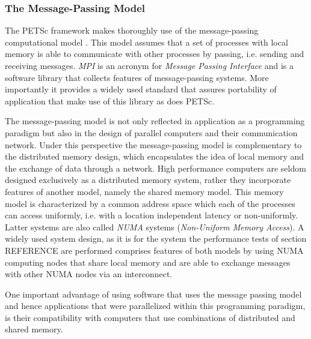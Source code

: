 \subsubsection{The Message-Passing Model}

The PETSc framework makes thoroughly use of the message-passing computational model \cite{gropp99}. This model assumes that a set of processes with local memory is able to communicate with other processes by passing, i.e. sending and receiving messages. \emph{MPI} is an acronym for \emph{Message Passing Interface} and is a software library that collects features of message-passing systems. More importantly it provides a widely used standard that assures portability of application that make use of this library as does PETSc. 

The message-passing model is not only reflected in application as a programming paradigm but also in the design of parallel computers and their communication network. Under this perspective the message-passing model is complementary to the distributed memory design, which encapsulates the idea of local memory and the exchange of data through a network. High performance computers are seldom designed exclusively as a distributed memory system, rather they incorporate features of another model, namely the shared memory model. This memory model is characterized by a common address space which each of the processes can access uniformly, i.e. with a location independent latency or non-uniformly. Latter systems are also called \emph{NUMA} systems (\emph{Non-Uniform Memory Access}). A widely used system design, as it is for the system the performance tests of section REFERENCE are performed comprises features of both models by using NUMA computing nodes that share local memory and are able to exchange messages with other NUMA nodes via an interconnect.

One important advantage of using software that uses the message passing model and hence applications that were parallelized within this programming paradigm, is their compatibility with computers that use combinations of distributed and shared memory.

